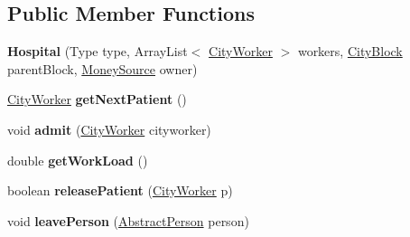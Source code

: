 \subsection*{Public Member Functions}
\begin{DoxyCompactItemize}
\item 
{\bfseries Hospital} (Type type, Array\+List$<$ \hyperlink{classpeople_1_1cityworkers_1_1_city_worker}{City\+Worker} $>$ workers, \hyperlink{classcities_1_1_city_block}{City\+Block} parent\+Block, \hyperlink{classuniverse_1_1_money_source}{Money\+Source} owner)\hypertarget{classbuildings_1_1workplaces_1_1_hospital_a092cf9f00281ccca2ce53f77f44f0ead}{}\label{classbuildings_1_1workplaces_1_1_hospital_a092cf9f00281ccca2ce53f77f44f0ead}

\item 
\hyperlink{classpeople_1_1cityworkers_1_1_city_worker}{City\+Worker} {\bfseries get\+Next\+Patient} ()\hypertarget{classbuildings_1_1workplaces_1_1_hospital_ae633cdab7fa50e26dc440397dc9f8284}{}\label{classbuildings_1_1workplaces_1_1_hospital_ae633cdab7fa50e26dc440397dc9f8284}

\item 
void {\bfseries admit} (\hyperlink{classpeople_1_1cityworkers_1_1_city_worker}{City\+Worker} cityworker)\hypertarget{classbuildings_1_1workplaces_1_1_hospital_aeb342645a67e4c22cf41cf91660118d8}{}\label{classbuildings_1_1workplaces_1_1_hospital_aeb342645a67e4c22cf41cf91660118d8}

\item 
double {\bfseries get\+Work\+Load} ()\hypertarget{classbuildings_1_1workplaces_1_1_hospital_af4a8da27b1c8c729fe148ae48213039f}{}\label{classbuildings_1_1workplaces_1_1_hospital_af4a8da27b1c8c729fe148ae48213039f}

\item 
boolean {\bfseries release\+Patient} (\hyperlink{classpeople_1_1cityworkers_1_1_city_worker}{City\+Worker} p)\hypertarget{classbuildings_1_1workplaces_1_1_hospital_a5192d92289b057e36a975b464a63bb0d}{}\label{classbuildings_1_1workplaces_1_1_hospital_a5192d92289b057e36a975b464a63bb0d}

\item 
void {\bfseries leave\+Person} (\hyperlink{classpeople_1_1_abstract_person}{Abstract\+Person} person)\hypertarget{classbuildings_1_1workplaces_1_1_hospital_a5c48e6dca33f610666b0ed8cd3c8758e}{}\label{classbuildings_1_1workplaces_1_1_hospital_a5c48e6dca33f610666b0ed8cd3c8758e}

\end{DoxyCompactItemize}
